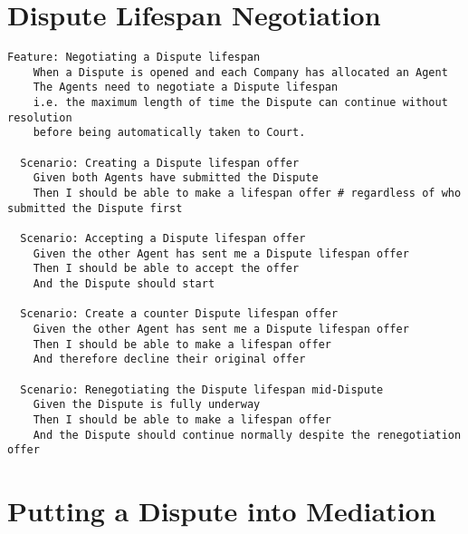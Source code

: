 \section{Dispute Lifespan Negotiation}

\begin{lstlisting}
Feature: Negotiating a Dispute lifespan
    When a Dispute is opened and each Company has allocated an Agent
    The Agents need to negotiate a Dispute lifespan
    i.e. the maximum length of time the Dispute can continue without resolution 
    before being automatically taken to Court.

  Scenario: Creating a Dispute lifespan offer
    Given both Agents have submitted the Dispute
    Then I should be able to make a lifespan offer # regardless of who submitted the Dispute first

  Scenario: Accepting a Dispute lifespan offer
    Given the other Agent has sent me a Dispute lifespan offer
    Then I should be able to accept the offer
    And the Dispute should start

  Scenario: Create a counter Dispute lifespan offer
    Given the other Agent has sent me a Dispute lifespan offer
    Then I should be able to make a lifespan offer
    And therefore decline their original offer

  Scenario: Renegotiating the Dispute lifespan mid-Dispute
    Given the Dispute is fully underway
    Then I should be able to make a lifespan offer
    And the Dispute should continue normally despite the renegotiation offer
\end{lstlisting}

\section{Putting a Dispute into Mediation}

